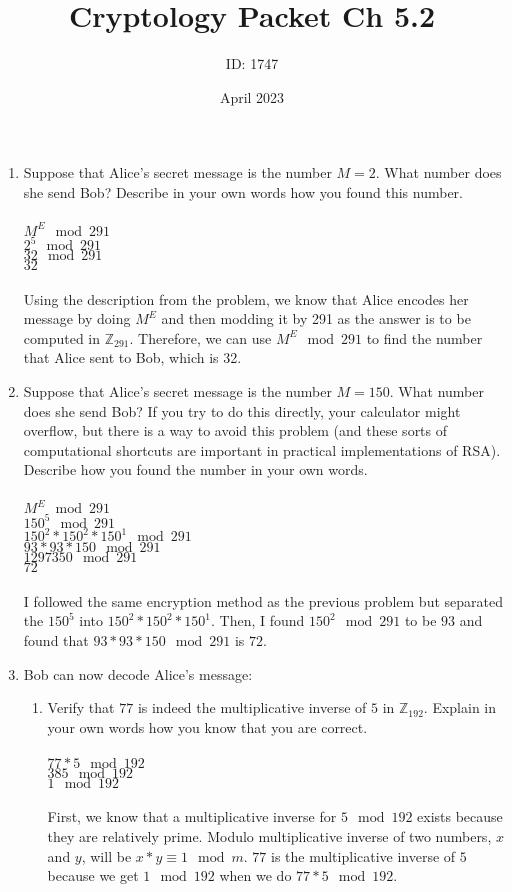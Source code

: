 \documentclass[]{article}
\date{April 2023}
\author{ID: 1747}
\title{Cryptology Packet Ch 5.2}
\begin{document}
\maketitle

\begin{enumerate}
    \item Suppose that Alice's secret message is the number $M=2$. What number does she send Bob? Describe in your own words how you found this number.
    \\\\$M^{E} \mod 291$
    \\$2^{5} \mod 291$
    \\$32 \mod 291$
    \\$32 $
    \\\\Using the description from the problem, we know that Alice encodes her message by doing $M^E$ and then modding it by 291 as the answer is to be computed in $\mathbb{Z}_{291}$. Therefore, we can use $M^{E} \mod 291$ to find the number that Alice sent to Bob, which is 32. 

    \item Suppose that Alice’s secret message is the number $M=150$. What number does she send Bob? If you try to do this directly, your calculator might overflow, but there is a way to avoid this problem (and these sorts of computational shortcuts are important in practical implementations of RSA). Describe how you found the number in your own words.
    \\\\$M^{E} \mod 291$
    \\$150^{5} \mod 291$
    \\$150^{2}*150^{2}*150^{1} \mod 291$
    \\$93 * 93 * 150 \mod 291$
    \\$1297350 \mod 291$
    \\$72$
    \\\\I followed the same encryption method as the previous problem but separated the $150^5$ into $150^2 * 150^2 *150^1$. Then, I found $150^2 \mod 291$ to be $93$ and found that $93*93*150 \mod 291$ is $72$.

    \item Bob can now decode Alice's message:
        \begin{enumerate}
            \item Verify that $77$ is indeed the multiplicative inverse of $5$ in $\mathbb{Z}_{192}$. Explain in your own words how you know that you are correct.
            \\\\$77*5 \mod 192$
            \\$385 \mod 192$
            \\$1 \mod 192$
            \\\\First, we know that a multiplicative inverse for $5 \mod 192$ exists because they are relatively prime. Modulo multiplicative inverse of two numbers, $x$ and $y$, will be $x*y \equiv 1 \mod m$. $77$ is the multiplicative inverse of $5$ because we get $1 \mod 192$ when we do $77*5 \mod 192$.


\end{enumerate}
\end{enumerate}
\end{document}
